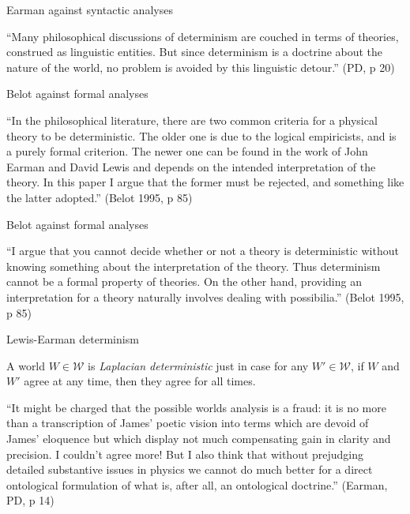 \documentclass[fleqn]{beamer}
\begin{document}
\begin{frame}{Earman against syntactic analyses}

  ``Many philosophical discussions of determinism are couched in terms
  of theories, construed as linguistic entities. But since determinism
  is a doctrine about the nature of the world, no problem is avoided
  by this linguistic detour.'' (PD, p 20)

\end{frame}

\begin{frame}{Belot against formal analyses}

  ``In the philosophical literature, there are two common criteria for
  a physical theory to be deterministic. The older one is due to the
  logical empiricists, and is a purely formal criterion. The newer one
  can be found in the work of John Earman and David Lewis and depends
  on the intended interpretation of the theory. In this paper I argue
  that the former must be rejected, and something like the latter
  adopted.'' (Belot 1995, p 85)

\end{frame}

\begin{frame}{Belot against formal analyses}

  ``I argue that you cannot decide whether or not a theory is
  deterministic without knowing something about the interpretation of
  the theory. Thus determinism cannot be a formal property of
  theories. On the other hand, providing an interpretation for a
  theory naturally involves dealing with possibilia.'' (Belot 1995, p
  85)

\end{frame}

\begin{frame}{Lewis-Earman determinism}

  \newcommand{\2}{\mathcal}

  A world $W\in\2W$ is \emph{Laplacian deterministic} just in case for
  any $W'\in\2W$, if $W$ and $W'$ agree at any time, then they agree
  for all times.

\end{frame}

\begin{frame}

  ``It might be charged that the possible worlds analysis is a fraud:
  it is no more than a transcription of James' poetic vision into
  terms which are devoid of James' eloquence but which display not
  much compensating gain in clarity and precision. I couldn't agree
  more! But I also think that without prejudging detailed substantive
  issues in physics we cannot do much better for a direct ontological
  formulation of what is, after all, an ontological doctrine.''
  (Earman, PD, p 14)


\end{frame}
\end{document}
